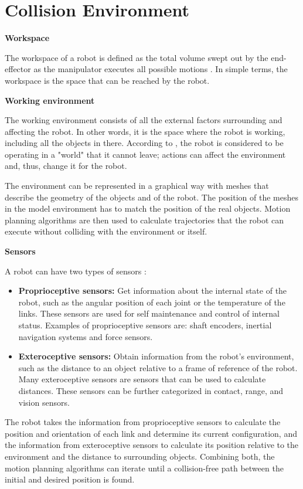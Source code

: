 \section{Collision Environment}

\textbf{Workspace}

The workspace of a robot is defined as the total volume swept out by the end-effector as the manipulator executes all possible motions \citep[chap. 1]{Handbook}. In simple terms, the workspace is the space that can be reached by the robot.

\textbf{Working environment}

The working environment consists of all the external factors surrounding and affecting the robot. In other words, it is the space where the robot is working, including all the objects in there. According to \citet{Taskspace}, the robot is considered to be operating in a "world" that it cannot leave; actions can affect the environment and, thus, change it for the robot. 

The environment can be represented in a graphical way with meshes that describe the geometry of the objects and of the robot. The position of the meshes in the model environment has to match the position of the real objects. Motion planning algorithms are then used to calculate trajectories that the robot can execute without colliding with the environment or itself. 

\textbf{Sensors}

A robot can have two types of sensors \citep[chap. 1]{Russel}:
\begin{itemize}
	\item \textbf{Proprioceptive sensors:} Get information about the internal state of the robot, such as the angular position of each joint or the temperature of the links. These sensors are used for self maintenance and control of internal status. Examples of proprioceptive sensors are: shaft encoders, inertial navigation systems and force sensors.
	\item \textbf{Exteroceptive sensors:} Obtain information from the robot's environment, such as the distance to an object relative to a frame of reference of the robot. Many exteroceptive sensors are sensors that can be used to calculate distances. These sensors can be further categorized in contact, range, and vision sensors.
\end{itemize}

The robot takes the information from proprioceptive sensors to calculate the position and orientation of each link and determine its current configuration, and the information from exteroceptive sensors to calculate its position relative to the environment and the distance to surrounding objects. Combining both, the motion planning algorithms can iterate until a collision-free path between the initial and desired position is found.

